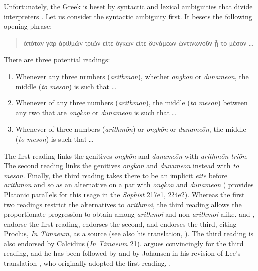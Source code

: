 Unfortunately, the Greek is beset by syntactic and lexical ambiguities that divide interpreters \citep{Prtichard:1990aa}. Let us consider the syntactic ambiguity first. It besets the following opening phrase:
\begin{quote}
{\sbl ὁπόταν γὰρ ἀριθμῶν τριῶν εἴτε ὄγκων εἴτε δυνάμεων ὡντινωνοῦν ᾖ τὸ μέσον \ldots}
\end{quote}
There are three potential readings:
\begin{enumerate}[(1)]
	\item Whenever any three numbers (\emph{arithmōn}), whether \emph{ongkōn} or \emph{dunameōn}, the middle (\emph{to meson}) is such that \ldots
	\item Whenever of any three numbers (\emph{arithmōn}), the middle (\emph{to meson}) between any two that are \emph{ongkōn} or \emph{dunameōn} is such that \ldots
	\item Whenever of three numbers  (\emph{arithmōn}) or \emph{ongkōn} or \emph{dunameōn}, the middle (\emph{to meson}) is such that \ldots
\end{enumerate}
The first reading links the genitives \emph{ongkōn} and \emph{dunameōn} with \emph{arithmōn triōn}. The second reading links the genitives \emph{ongkōn} and \emph{dunameōn} instead with \emph{to meson}. Finally, the third reading takes there to be an implicit \emph{eite} before \emph{arithmōn} and so as an alternative on a par with \emph{ongkōn} and \emph{dunameōn} (\citealt[99]{Taylor:1928qb} provides Platonic parallels for this usage in the \emph{Sophist} 217e1, 224e2). Whereas the first two readings restrict the alternatives to \emph{arithmoi}, the third reading allows the proportionate progression to obtain among \emph{arithmoi} and non-\emph{arithmoi} alike. \citet[97 n12]{Archer-Hind:1888qd} and \citet[59]{Bury:1929jb}, endorse the first reading, \citet[44]{Cornford:1935fk} endorses the second, and \citet[96--99]{Taylor:1928qb} endorses the third, citing Proclus, \emph{In Timaeum}, as a source (see also his translation, \citeyear[28]{Taylor:1929ov}). The third reading is also endorsed by Calcidius (\emph{In Timaeum} 21). \citet{Prtichard:1990aa} argues convincingly for the third reading, and he has been followed by \citet{Zeyl:2000cs} and by Johansen in his revision of Lee's translation \citeyearpar{Lee:2008ca}, who originally adopted the first reading, \citeyearpar{Lee:1965fh}.

